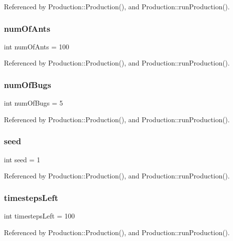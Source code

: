 Referenced by Production\+::\+Production(), and Production\+::run\+Production().

\mbox{\label{Production_8cpp_abc8f7d0611cd92dbb5a8bb94d1e2c835}} 
\subsubsection{num\+Of\+Ants}
{\footnotesize\ttfamily int num\+Of\+Ants = 100}



Referenced by Production\+::\+Production(), and Production\+::run\+Production().

\mbox{\label{Production_8cpp_abd4301b505cb70220e9ce2248d3d38b1}} 
\subsubsection{num\+Of\+Bugs}
{\footnotesize\ttfamily int num\+Of\+Bugs = 5}



Referenced by Production\+::\+Production(), and Production\+::run\+Production().

\mbox{\label{Production_8cpp_a1447ad288a0a73454510f5777bdc3ed1}} 
\subsubsection{seed}
{\footnotesize\ttfamily int seed = 1}



Referenced by Production\+::\+Production(), and Production\+::run\+Production().

\mbox{\label{Production_8cpp_ae72258ca980f4d0d75ef8c4226b282da}} 
\subsubsection{timesteps\+Left}
{\footnotesize\ttfamily int timesteps\+Left = 100}



Referenced by Production\+::\+Production(), and Production\+::run\+Production().

